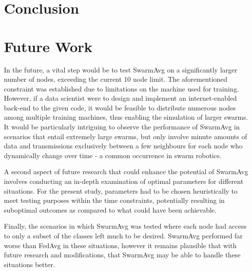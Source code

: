 \section{Conclusion}





\section{Future Work}
In the future, a vital step would be to test SwarmAvg on a significantly larger number of nodes, exceeding the current 10 node limit. The aforementioned constraint was established due to limitations on the machine used for training. However, if a data scientist were to design and implement an internet-enabled back-end to the given code, it would be feasible to distribute numerous nodes among multiple training machines, thus enabling the simulation of larger swarms. It would be particularly intriguing to observe the performance of SwarmAvg in scenarios that entail extremely large swarms, but only involve minute amounts of data and transmissions exclusively between a few neighbours for each node who dynamically change over time - a common occurrence in swarm robotics.

A second aspect of future research that could enhance the potential of SwarmAvg involves conducting an in-depth examination of optimal parameters for different situations. For the present study, parameters had to be chosen heuristically to meet testing purposes within the time constraints, potentially resulting in suboptimal outcomes as compared to what could have been achievable.

Finally, the scenarios in which SwarmAvg was tested where each node had access to only a subset of the classes left much to be desired. SwarmAvg performed far worse than FedAvg in these situations, however it remains plausible that with future research and modifications, that SwarmAvg may be able to handle these situations better.